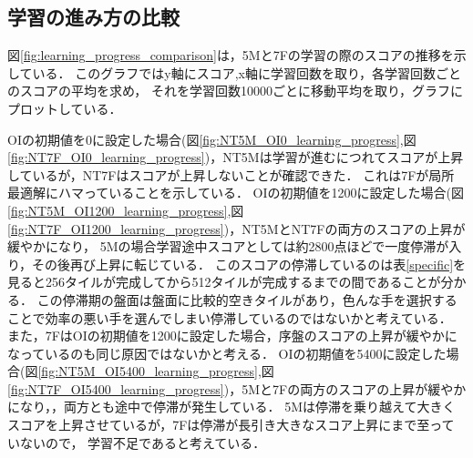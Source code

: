 \subsection{学習の進み方の比較}
図\ref{fig:learning_progress_comparison}は，5Mと7Fの学習の際のスコアの推移を示している．
このグラフではy軸にスコア,x軸に学習回数を取り，各学習回数ごとのスコアの平均を求め，
それを学習回数10000ごとに移動平均を取り，グラフにプロットしている．

OIの初期値を0に設定した場合(図\ref{fig:NT5M_OI0_learning_progress},図\ref{fig:NT7F_OI0_learning_progress})，NT5Mは学習が進むにつれてスコアが上昇しているが，NT7Fはスコアが上昇しないことが確認できた．
これは7Fが局所最適解にハマっていることを示している．
OIの初期値を1200に設定した場合(図\ref{fig:NT5M_OI1200_learning_progress},図\ref{fig:NT7F_OI1200_learning_progress})，NT5MとNT7Fの両方のスコアの上昇が緩やかになり，
5Mの場合学習途中スコアとしては約2800点ほどで一度停滞が入り，その後再び上昇に転じている．
このスコアの停滞しているのは表\ref{specific}を見ると256タイルが完成してから512タイルが完成するまでの間であることが分かる．
この停滞期の盤面は盤面に比較的空きタイルがあり，色んな手を選択することで効率の悪い手を選んでしまい停滞しているのではないかと考えている．
また，7FはOIの初期値を1200に設定した場合，序盤のスコアの上昇が緩やかになっているのも同じ原因ではないかと考える．
OIの初期値を5400に設定した場合(図\ref{fig:NT5M_OI5400_learning_progress},図\ref{fig:NT7F_OI5400_learning_progress})，5Mと7Fの両方のスコアの上昇が緩やかになり，，両方とも途中で停滞が発生している．
5Mは停滞を乗り越えて大きくスコアを上昇させているが，7Fは停滞が長引き大きなスコア上昇にまで至っていないので，
学習不足であると考えている．

